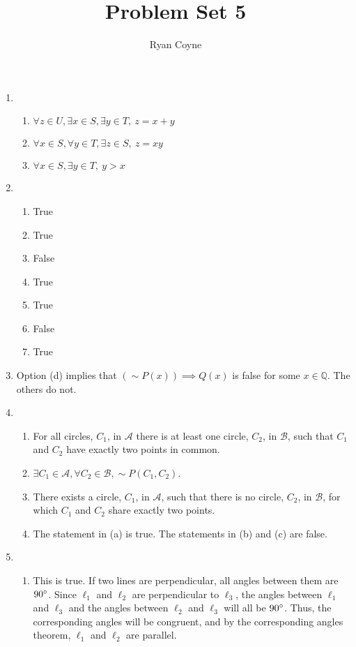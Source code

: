 \documentclass[12pt]{article}
\renewcommand*{\neg}{{\sim}}
\begin{document}
    \title{Problem Set 5}
    \author{Ryan Coyne}
    \maketitle
    \begin{enumerate}
        \item \begin{enumerate}
            \item \(\forall z \in U, \exists x \in S, \exists y \in T,~ z=x+y \)
            \item \(\forall x \in S, \forall y \in T, \exists z \in S,~ z = xy\)
            \item \(\forall x\in S, \exists y \in T,~ y>x\)
        \end{enumerate}
        \item\begin{enumerate}
            \item True
            \item True
            \item False
            \item True
            \item True
            \item False
            \item True
        \end{enumerate}
        \item Option (d) implies that \((\neg P(x)) \implies Q(x)\) is false for some \(x\in \mathbb{Q}\). The others do not.
        \item \begin{enumerate}
            \item For all circles, \(C_1\), in \(\mathcal{A}\) there is at least one circle, \(C_2\), in \(\mathcal{B}\), such that \(C_1\) and \(C_2\) have exactly two points in common.
            \item \(\exists C_1 \in \mathcal{A}, \forall C_2 \in \mathcal{B}, \neg P(C_1, C_2)\).
            \item There exists a circle, \(C_1\), in \(\mathcal{A}\), such that there is no circle, \(C_2\), in \(\mathcal{B}\), for which \(C_1\) and \(C_2\) share exactly two points.
            \item The statement in (a) is true. The statements in (b) and (c) are false.
        \end{enumerate}
        \item \begin{enumerate}
            \item This is true.  If two lines are perpendicular, all angles between them are \(90\degree\). Since \(\ell_1\) and \(\ell_2\) are perpendicular to \(\ell_3\), the angles between \(\ell_1\) and \(\ell_3\) and the angles between \(\ell_2\) and \(\ell_3\) will all be \(90\degree\). Thus, the corresponding angles will be congruent, and by the corresponding angles theorem, \(\ell_1\) and \(\ell_2\) are parallel.

\end{enumerate}
\end{enumerate}
\end{document}
